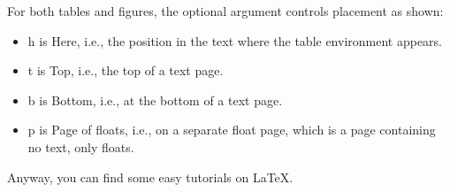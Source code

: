For both tables and figures, the optional argument controls
placement as shown:
\begin{itemize}
  \item{} h is Here, i.e., the position in the text where the table environment appears.
  \item{} t is Top, i.e., the top of a text page.
  \item{} b is Bottom, i.e., at the bottom of a text page.
  \item{} p is Page of floats, i.e., on a separate float page,
    which is a page containing no text, only floats.
\end{itemize}

Anyway, you can find some easy tutorials on \LaTeX{}.